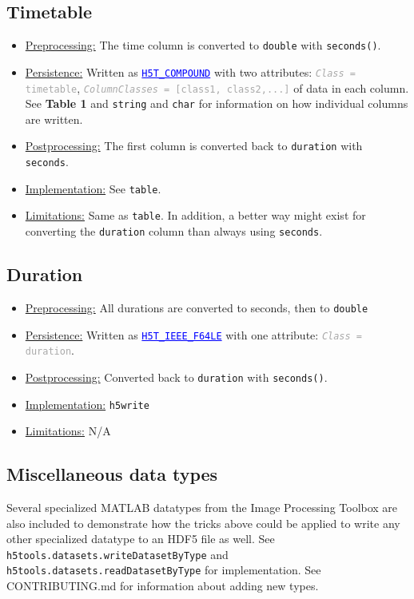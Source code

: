 \documentclass[11pt]{exam}
\newcommand\myurl[1]{\textcolor{blue}{\underline{#1}}}
\newcommand\myfcn[1]{\colorbox{codegray}{\textcolor{codeblue}{\texttt{#1}}}}
\newcommand\matfcn[1]{\textcolor{darkteal}{\texttt{#1}}}
\newcommand\hdftype[1]{\texttt{\myurl{#1}}}
\newcommand\myatt[2]{\textcolor{darkgray}{\texttt{\textit{#1} = #2}}}
\begin{document}
		\subsection{Timetable}
		\noindent
		\begin{itemize}
			\item \underline{Preprocessing:} The time column is converted to \texttt{double} with \matfcn{seconds()}. 
			\item \underline{Persistence:} Written as \hdftype{H5T\_COMPOUND} with two attributes: \myatt{Class}{timetable}, \myatt{ColumnClasses}{[class1, class2,...]} of data in each column. See \textbf{Table 1} and \texttt{string} and \texttt{char} for information on how individual columns are written.
			\item \underline{Postprocessing:} The first column is converted back to \texttt{duration} with \matfcn{seconds}.
			\item \underline{Implementation:} See \texttt{table}.%
			\item \underline{Limitations:} Same as \texttt{table}. In addition, a better way might exist for converting the \texttt{duration} column than always using \matfcn{seconds}.
		\end{itemize}

		\subsection{Duration}
		\noindent
		\begin{itemize}
			\item \underline{Preprocessing:} All durations are converted to seconds, then to \texttt{double}
			\item \underline{Persistence:} Written as \hdftype{H5T\_IEEE\_F64LE} with one attribute: \myatt{Class}{duration}.
			\item \underline{Postprocessing:} Converted back to \texttt{duration} with \matfcn{seconds()}.
			\item \underline{Implementation:} \matfcn{h5write}%
			\item \underline{Limitations:} N/A
		\end{itemize}

        \subsection{Miscellaneous data types}
        \noindent Several specialized MATLAB datatypes from the Image Processing Toolbox are also included to demonstrate how the tricks above could be applied to write any other specialized datatype to an HDF5 file as well. See \myfcn{h5tools.datasets.writeDatasetByType} and \myfcn{h5tools.datasets.readDatasetByType} for implementation. See CONTRIBUTING.md for information about adding new types.
\end{document}
